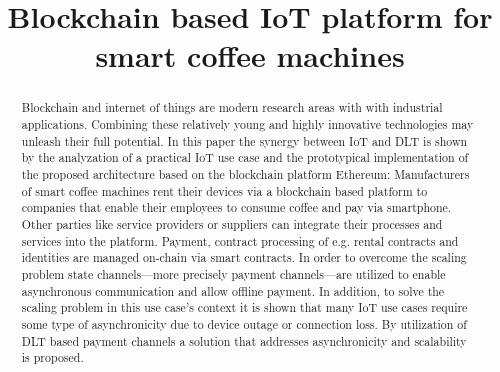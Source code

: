 \documentclass[conference]{IEEEtran}
\begin{document}
\title{Blockchain based IoT platform for smart coffee machines}

\author{

  \and


  \and

}

\maketitle

\begin{abstract}
Blockchain and internet of things are modern research areas with with industrial applications. Combining these relatively young and highly innovative technologies may unleash their full potential. In this paper the synergy between IoT and DLT is shown by the analyzation of a practical IoT use case and the prototypical implementation of the proposed architecture based on the blockchain platform Ethereum: Manufacturers of smart coffee machines rent their devices via a blockchain based platform to companies that enable their employees to consume coffee and pay via smartphone. Other parties like service providers or suppliers can integrate their processes and services into the platform. Payment, contract processing of e.g. rental contracts and identities are managed on-chain via smart contracts. In order to overcome the scaling problem state channels---more precisely payment channels---are utilized to enable asynchronous communication and allow offline payment. In addition, to solve the scaling problem in this use case's context it is shown that many IoT use cases require some type of asynchronicity due to device outage or connection loss. By utilization of DLT based payment channels a solution that addresses asynchronicity and scalability is proposed.
\end{abstract}
\end{document}
